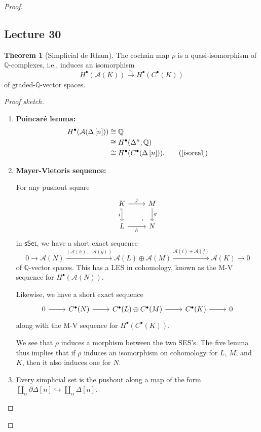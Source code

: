 \documentclass[10pt,letterpaper,cm]{nupset}
\theoremstyle{definition}
\theoremstyle{theorem}
\newtheorem{theorem}[defn]{Theorem}
\theoremstyle{remark}
\newcommand{\A}{\mathcal A}
\newcommand{\Q}{\mathbb Q}
\newcommand{\1}{\mathbb{1}}
\newcommand{\0}{\vec 0}
\newcommand{\be}{\begin{enumerate}}
\newcommand{\ee}{\end{enumerate}}
\begin{document}
\begin{proof}
\subsection{Lecture 30}

\begin{theorem}[Simplicial de Rham]\label{SDR}
The cochain map $\rho$ is a quasi-isomorphism of $\Q$-complexes, i.e., induces an isomorphism 
\[
H^{\bullet}(\A(K)) \xrightarrow{\sim} H^{\bullet}(C^{\bullet}(K))
\] of graded-$\Q$-vector spaces. 
\end{theorem}
\begin{proof}[Proof sketch] $ $
\be
\item \textbf{Poincar\'e lemma:} 
\begin{align*}
H^{\bullet}(\A(\Delta\left[n\right])) &  \cong \Q 
\\ & \cong H^{\bullet}(\Delta^n; \Q) 
\\ & \cong H^{\bullet}(C^{\bullet}(\Delta\left[n\right])). \tag{\cref{isoreal}} 
\end{align*}
\item \textbf{Mayer-Vietoris sequence:} 

For any pushout square
\[
\begin{tikzcd}
	K & M \\
	L & N
	\arrow["i"', hook', from=1-1, to=2-1]
	\arrow["h"', from=2-1, to=2-2]
	\arrow["g", from=1-2, to=2-2]
	\arrow["j", from=1-1, to=1-2]
	\arrow["\lrcorner"{anchor=center, pos=0.125, rotate=180}, draw=none, from=2-2, to=1-1]
\end{tikzcd}
\] in $\mathsf{sSet}$,  we have a short exact sequence
\[
0 \longrightarrow \A(N) \xrightarrow{\left(\A(h), {-\A(g)}\right)} \A(L) \oplus \A(M) \xrightarrow{\A(i) + \A(j)} \A(K) \longrightarrow 0 
\] of $\Q$-vector spaces. This has a LES in cohomology, known as the M-V sequence for $H^{\bullet}(\A(N))$.

Likewise, we have a short exact sequence
\[
\begin{tikzcd}
	0 & {C^{\bullet}(N)} & {C^{\bullet}(L)\oplus C^{\bullet}(M)} & {C^{\bullet}(K)} & 0
	\arrow[from=1-1, to=1-2]
	\arrow[from=1-4, to=1-5]
	\arrow[from=1-2, to=1-3]
	\arrow[from=1-3, to=1-4]
\end{tikzcd}
\] along with the M-V sequence for $H^{\bullet}(C^{\bullet}(K))$. 

We see that $\rho$ induces a morphism between the two SES's. The five lemma thus implies that if $\rho$ induces an isomorphism on cohomology for $L$, $M$, and $K$, then it also induces one for $N$.
\item Every simplicial set is the pushout along a map of the form $\coprod_{\alpha} \partial{\Delta\left[n\right]} \hookrightarrow \coprod_{\alpha}\Delta\left[n\right]$.
\ee
\end{proof}


\end{proof}
\end{document}
